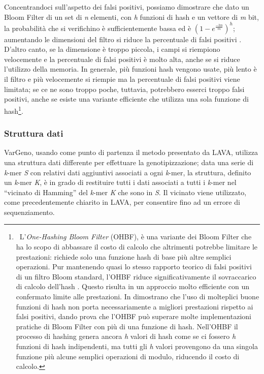 \documentclass[../main.tex]{subfiles}
\begin{document}
Concentrandoci sull'aspetto dei falsi positivi, possiamo dimostrare che dato un Bloom Filter di un set di \textit{n} elementi, con \textit{h} funzioni di hash e un vettore di \textit{m} bit, la probabilità che si verifichino è sufficientemente bassa ed è $(1 - e^{\frac{-hn}{m}})^{h} $; aumentando le dimensioni del filtro si riduce la percentuale di falsi positivi \cite{bernardini2019malva} \cite{compressedbloomfilter}. D'altro canto, se la dimensione è troppo piccola, i campi si riempiono velocemente e la percentuale di falsi positivi è molto alta, anche se si riduce l'utilizzo della memoria. In generale, più funzioni hash vengono usate, più lento è il filtro e più velocemente si riempie ma la percentuale di falsi positivi viene limitata; se ce ne sono troppo poche, tuttavia, potrebbero esserci troppo falsi positivi, anche se esiste una variante efficiente che utilizza una sola funzione di hash\footnote{ \label{nota:OHBF} \ L'\textit{One-Hashing Bloom Filter} (OHBF), è una variante dei Bloom Filter che ha lo scopo di abbassare il costo di calcolo che altrimenti potrebbe limitare le prestazioni: richiede solo una funzione hash di base più altre semplici operazioni. Pur mantenendo quasi lo stesso rapporto teorico di falsi positivi di un filtro Bloom standard, l'OHBF riduce significativamente il sovraccarico di calcolo dell'hash \cite{bloomonehash}. Questo risulta in un approccio molto efficiente con un confermato limite alle prestazioni. In \cite{bloomonehash} dimostrano che l'uso di molteplici buone funzioni di hash non porta necessariamente a migliori prestazioni rispetto ai falsi positivi, dando prova che l'OHBF può superare molte implementazioni pratiche di Bloom Filter con più di una funzione di hash. Nell'OHBF il processo di hashing genera ancora \textit{h} valori di hash come se ci fossero \textit{h} funzioni di hash indipendenti, ma tutti gli \textit{h} valori provengono da una singola funzione più alcune semplici operazioni di modulo, riducendo il costo di calcolo.}.

\subsubsection{Struttura dati}
VarGeno, usando come punto di partenza il metodo presentato da LAVA, utilizza una struttura dati differente per effettuare la genotipizzazione; data una serie di \textit{k}-mer \textit{S} con relativi dati aggiuntivi associati a ogni \textit{k}-mer, la struttura, definito un \textit{k}-mer \textit{K}, è in grado di restituire tutti i dati associati a tutti i \textit{k}-mer nel “vicinato di Hamming” del \textit{k}-mer \textit{K} che sono in \textit{S}. Il vicinato viene utilizzato, come precedentemente chiarito in LAVA, per consentire fino ad un errore di sequenziamento.
\end{document}
